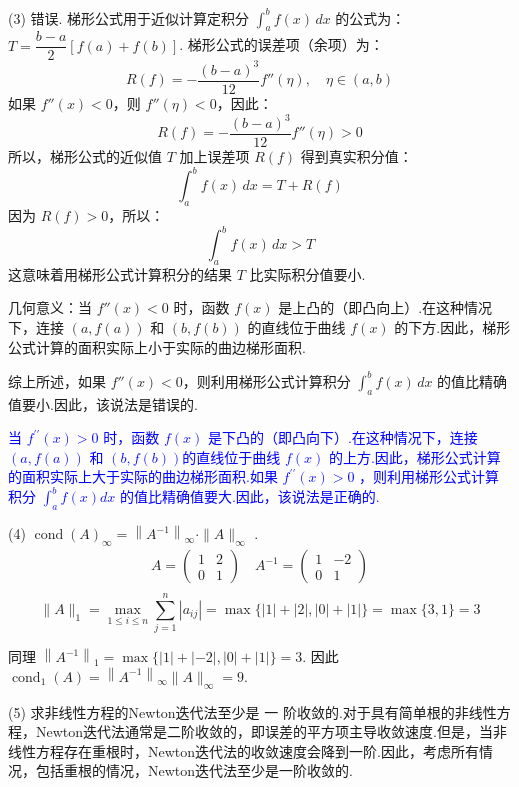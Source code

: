 (3) 错误.
梯形公式用于近似计算定积分 $\int_{a}^{b} f(x) \, dx$ 的公式为：$T = \dfrac{b-a}{2} [f(a) + f(b)]$.
梯形公式的误差项（余项）为：
$$
R(f) = -\frac{(b-a)^3}{12} f''(\eta), \quad \eta \in (a, b)
$$
如果 $f''(x) < 0$，则 $f''(\eta) < 0$，因此：
$$
R(f) = -\frac{(b-a)^3}{12} f''(\eta) > 0
$$
所以，梯形公式的近似值 $T$ 加上误差项 $R(f)$ 得到真实积分值：
$$
\int_{a}^{b} f(x) \, dx = T + R(f)
$$
因为 $R(f) > 0$，所以：
$$
\int_{a}^{b} f(x) \, dx > T
$$
这意味着用梯形公式计算积分的结果 $T$ 比实际积分值要小.

几何意义：当 $f''(x) < 0$ 时，函数 $f(x)$ 是上凸的（即凸向上）.在这种情况下，连接 $ (a, f(a)) $ 和 $ (b, f(b)) $ 的直线位于曲线 $f(x)$ 的下方.因此，梯形公式计算的面积实际上小于实际的曲边梯形面积.

综上所述，如果 $f''(x) < 0$，则利用梯形公式计算积分 $\int_{a}^{b} f(x) \, dx$ 的值比精确值要小.因此，该说法是错误的.

\textcolor{blue}{当 $ f^{\prime \prime}(x)>0 $ 时，函数 $ f(x) $ 是下凸的（即凸向下）.在这种情况下，连接 $ (a, f(a)) $ 和 $ (b, f(b)) $的直线位于曲线 $ f(x) $ 的上方.因此，梯形公式计算的面积实际上大于实际的曲边梯形面积.如果 $ f^{\prime \prime}(x)>0 $ ，则利用梯形公式计算积分 $ \int_{a}^{b} f(x) d x $ 的值比精确值要大.因此，该说法是正确的.}

\vspace{\baselineskip}

(4) $\operatorname{cond}(A)_{\infty}=\left\|A^{-1}\right\|_{\infty} \cdot\|A\|_{\infty}$ .
$$
\begin{array}{l}
A=\left(\begin{array}{ll}
1 & 2 \\
0 & 1
\end{array}\right) \quad A^{-1}=\left(\begin{array}{cc}
1 & -2 \\
0 & 1
\end{array}\right) \\
\end{array}
$$
$$\|A\|_{1}=\max _{1 \leqslant i \leqslant n} \sum_{j=1}^{n}\left|a_{i j}\right|=\max \{|1|+|2|,|0|+|1|\} 
=\max \{3,1\}=3 $$

同理 $ \left\|A^{-1}\right\|_{1}=\max \{|1|+|-2|,|0|+|1|\}=3 $.
因此 $ \operatorname{cond}_{1}(A)=\left\|A^{-1}\right\|_{\infty}\|A\|_{\infty}=9 $.

\vspace{\baselineskip}

(5) 求非线性方程的Newton迭代法至少是 一 阶收敛的.对于具有简单根的非线性方程，Newton迭代法通常是二阶收敛的，即误差的平方项主导收敛速度.但是，当非线性方程存在重根时，Newton迭代法的收敛速度会降到一阶.因此，考虑所有情况，包括重根的情况，Newton迭代法至少是一阶收敛的.

